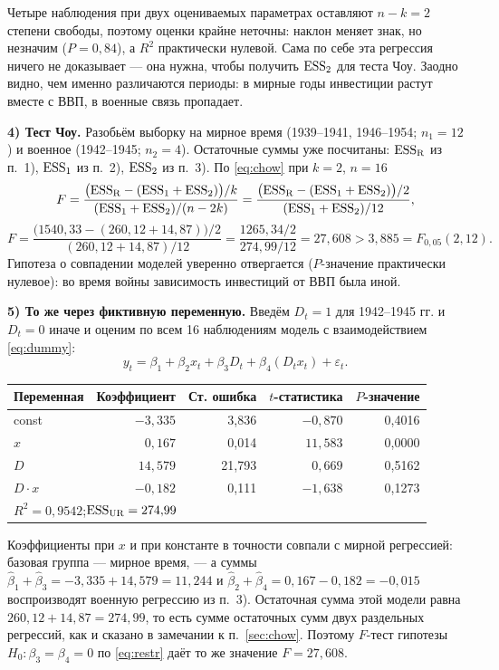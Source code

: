 \begin{solution}
\noindent Четыре наблюдения при двух оцениваемых параметрах оставляют
$n - k = 2$ степени свободы, поэтому оценки крайне неточны: наклон меняет знак,
но незначим ($P = 0{,}84$), а $R^2$ практически нулевой. Сама по себе эта
регрессия ничего не доказывает — она нужна, чтобы получить $\mathrm{ESS}_2$ для теста
Чоу. Заодно видно, чем именно различаются периоды: в мирные годы инвестиции
растут вместе с ВВП, в военные связь пропадает.

\medskip
\textbf{4) Тест Чоу.} Разобьём выборку на мирное время (1939--1941, 1946--1954;
$n_1 = 12$) и военное (1942--1945; $n_2 = 4$). Остаточные суммы уже
посчитаны: $\mathrm{ESS}_{\mathrm{R}}$ из п.~1), $\mathrm{ESS}_1$ из п.~2), $\mathrm{ESS}_2$ из п.~3).
По \eqref{eq:chow} при $k = 2$, $n = 16$
\[
  F = \frac{\bigl(\mathrm{ESS}_{\mathrm{R}} - (\mathrm{ESS}_1 + \mathrm{ESS}_2)\bigr)/k}
           {(\mathrm{ESS}_1 + \mathrm{ESS}_2)/(n - 2k)}
    = \frac{\bigl(\mathrm{ESS}_{\mathrm{R}} - (\mathrm{ESS}_1 + \mathrm{ESS}_2)\bigr)/2}
           {(\mathrm{ESS}_1 + \mathrm{ESS}_2)/12},
\]
\[
  F = \frac{\bigl(1540{,}33 - (260{,}12 + 14{,}87)\bigr)/2}
           {(260{,}12 + 14{,}87)/12}
    = \frac{1265{,}34/2}{274{,}99/12}
    = 27{,}608 > 3{,}885 = F_{0{,}05}(2, 12).
\]
Гипотеза о совпадении моделей уверенно отвергается ($P$-значение практически
нулевое): во время войны зависимость инвестиций от ВВП была иной.

\medskip
\textbf{5) То же через фиктивную переменную.} Введём $D_t = 1$ для 1942--1945
гг. и $D_t = 0$ иначе и оценим по всем 16 наблюдениям модель с взаимодействием
\eqref{eq:dummy}:
\[
  y_t = \beta_1 + \beta_2x_t + \beta_3D_t + \beta_4(D_tx_t) + \varepsilon_t .
\]
\begin{center}
\begin{tabular}{lrrrr}
\toprule
Переменная & Коэффициент & Ст. ошибка & $t$-статистика & $P$-значение \\
\midrule
const      & $-3{,}335$ & \phantom{0}3,836 & $-0{,}870$ & 0,4016 \\
$x$        & $\phantom{-}0{,}167$ & \phantom{0}0,014 & $11{,}583$ & 0,0000 \\
$D$        & $14{,}579$ & 21,793 & $\phantom{-}0{,}669$ & 0,5162 \\
$D\cdot x$ & $-0{,}182$ & \phantom{0}0,111 & $-1{,}638$ & 0,1273 \\
\midrule
\multicolumn{5}{l}{$R^2 = 0{,}9542$;\quad $\mathrm{ESS}_{\mathrm{UR}} = 274{,}99$} \\
\bottomrule
\end{tabular}
\end{center}

\noindent Коэффициенты при $x$ и при константе в точности совпали с мирной
регрессией: базовая группа — мирное время, — а суммы
$\widehat{\beta}_1 + \widehat{\beta}_3 = -3{,}335 + 14{,}579 = 11{,}244$ и
$\widehat{\beta}_2 + \widehat{\beta}_4 = 0{,}167 - 0{,}182 = -0{,}015$
воспроизводят военную регрессию из п.~3). Остаточная сумма этой модели равна
$260{,}12 + 14{,}87 = 274{,}99$, то есть сумме остаточных сумм двух раздельных
регрессий, как и сказано в замечании к п.~\ref{sec:chow}. Поэтому $F$-тест
гипотезы $H_0\colon \beta_3 = \beta_4 = 0$ по \eqref{eq:restr} даёт то же
значение $F = 27{,}608$.


\end{solution}
